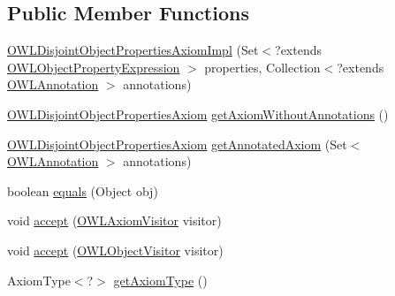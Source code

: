 \subsection*{Public Member Functions}
\begin{DoxyCompactItemize}
\item 
\hyperlink{classuk_1_1ac_1_1manchester_1_1cs_1_1owl_1_1owlapi_1_1_o_w_l_disjoint_object_properties_axiom_impl_a799dd0b79cd0dcae85999a8fda302f03}{O\-W\-L\-Disjoint\-Object\-Properties\-Axiom\-Impl} (Set$<$?extends \hyperlink{interfaceorg_1_1semanticweb_1_1owlapi_1_1model_1_1_o_w_l_object_property_expression}{O\-W\-L\-Object\-Property\-Expression} $>$ properties, Collection$<$?extends \hyperlink{interfaceorg_1_1semanticweb_1_1owlapi_1_1model_1_1_o_w_l_annotation}{O\-W\-L\-Annotation} $>$ annotations)
\item 
\hyperlink{interfaceorg_1_1semanticweb_1_1owlapi_1_1model_1_1_o_w_l_disjoint_object_properties_axiom}{O\-W\-L\-Disjoint\-Object\-Properties\-Axiom} \hyperlink{classuk_1_1ac_1_1manchester_1_1cs_1_1owl_1_1owlapi_1_1_o_w_l_disjoint_object_properties_axiom_impl_a124a2d49752de4c7ef538db694622d2e}{get\-Axiom\-Without\-Annotations} ()
\item 
\hyperlink{interfaceorg_1_1semanticweb_1_1owlapi_1_1model_1_1_o_w_l_disjoint_object_properties_axiom}{O\-W\-L\-Disjoint\-Object\-Properties\-Axiom} \hyperlink{classuk_1_1ac_1_1manchester_1_1cs_1_1owl_1_1owlapi_1_1_o_w_l_disjoint_object_properties_axiom_impl_a0a4d1072643a52bdc896d68170d343ae}{get\-Annotated\-Axiom} (Set$<$ \hyperlink{interfaceorg_1_1semanticweb_1_1owlapi_1_1model_1_1_o_w_l_annotation}{O\-W\-L\-Annotation} $>$ annotations)
\item 
boolean \hyperlink{classuk_1_1ac_1_1manchester_1_1cs_1_1owl_1_1owlapi_1_1_o_w_l_disjoint_object_properties_axiom_impl_a5d03d193919f8fc8ccc7f14332456ef6}{equals} (Object obj)
\item 
void \hyperlink{classuk_1_1ac_1_1manchester_1_1cs_1_1owl_1_1owlapi_1_1_o_w_l_disjoint_object_properties_axiom_impl_a1e41b6f4534eaafa71a6c5c46da80ea5}{accept} (\hyperlink{interfaceorg_1_1semanticweb_1_1owlapi_1_1model_1_1_o_w_l_axiom_visitor}{O\-W\-L\-Axiom\-Visitor} visitor)
\item 
void \hyperlink{classuk_1_1ac_1_1manchester_1_1cs_1_1owl_1_1owlapi_1_1_o_w_l_disjoint_object_properties_axiom_impl_ac778d7688a070535fce4837fe0f57206}{accept} (\hyperlink{interfaceorg_1_1semanticweb_1_1owlapi_1_1model_1_1_o_w_l_object_visitor}{O\-W\-L\-Object\-Visitor} visitor)
\item 
Axiom\-Type$<$?$>$ \hyperlink{classuk_1_1ac_1_1manchester_1_1cs_1_1owl_1_1owlapi_1_1_o_w_l_disjoint_object_properties_axiom_impl_a11afe22f09690c2066a87973ca216f8c}{get\-Axiom\-Type} ()
\end{DoxyCompactItemize}
